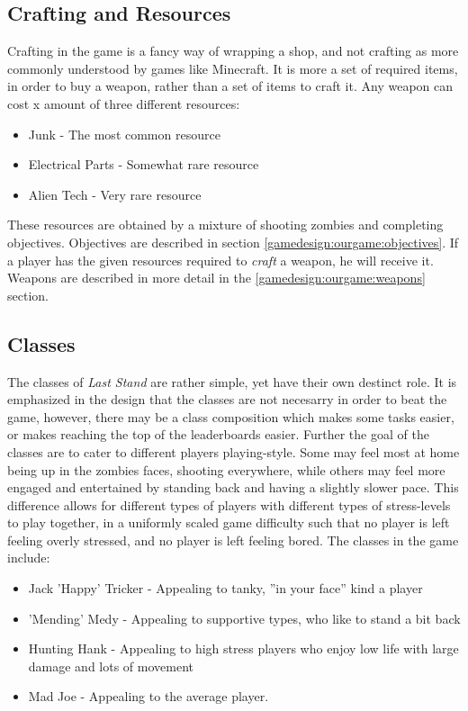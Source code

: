 \subsection*{Crafting and Resources}\label{gamedesign:ourgame:crafting}
Crafting in the game is a fancy way of wrapping a shop, and not crafting as more commonly understood by games like Minecraft. It is more a set of required items, in order to buy a weapon, rather than a set of items to craft it. Any weapon can cost x amount of three different resources:
\begin{itemize}
\item Junk - The most common resource
\item Electrical Parts - Somewhat rare resource
\item Alien Tech - Very rare resource 
\end{itemize}

These resources are obtained by a mixture of shooting zombies and completing objectives. Objectives are described in section \ref{gamedesign:ourgame:objectives}. If a player has the given resources required to \emph{craft} a weapon, he will receive it. Weapons are described in more detail in the \ref{gamedesign:ourgame:weapons} section.

\subsection*{Classes}\label{gamedesign:ourgame:classes}
The classes of \emph{Last Stand} are rather simple, yet have their own destinct role. It is emphasized in the design that the classes are not necesarry in order to beat the game, however, there may be a class composition which makes some tasks easier, or makes reaching the top of the leaderboards easier. 
Further the goal of the classes are to cater to different players playing-style. Some may feel most at home being up in the zombies faces, shooting everywhere, while others may feel more engaged and entertained by standing back and having a slightly slower pace. This difference allows for different types of players with different types of stress-levels to play together, in a uniformly scaled game difficulty such that no player is left feeling overly stressed, and no player is left feeling bored. The classes in the game include:

\begin{itemize}
\item Jack 'Happy' Tricker - Appealing to tanky, ''in your face'' kind a player
\item 'Mending' Medy - Appealing to supportive types, who like to stand a bit back
\item Hunting Hank - Appealing to high stress players who enjoy low life with large damage and lots of movement
\item Mad Joe - Appealing to the average player.
\end{itemize}

